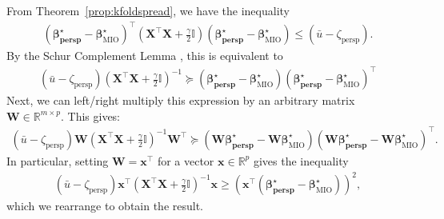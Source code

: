 \documentclass[ijoc,noblindrev]{informs3} %
\newcommand{\ag}[1]{{\color{black}#1}}
\begin{document}
From Theorem~\ref{prop:kfoldspread}, we have the inequality
\begin{align}
(\bm{\beta^\star_{\text{persp}}}- \bm{\beta}^\star_{\text{MIO}})^\top \left(\bm{X}^\top \bm{X}+\frac{\gamma}{2} \bm{\mathbb{I}}\right) (\bm{\beta^\star_{\text{persp}}}- \bm{\beta}^\star_{\text{MIO}}) \leq (\bar{u}-\zeta_{\text{persp}}).
	\end{align}
 By the Schur Complement Lemma \citep[see, e.g.,][]{boyd1994linear}, this is equivalent to
 \begin{align*}
     (\bar{u}-\zeta_{\text{persp}}) \left(\bm{X}^\top \bm{X}+\frac{\gamma}{2} \bm{\mathbb{I}}\right)^{-1}\succeq (\bm{\beta^\star_{\text{persp}}}- \bm{\beta}^\star_{\text{MIO}})(\bm{\beta^\star_{\text{persp}}}- \bm{\beta}^\star_{\text{MIO}})^\top
 \end{align*}
 Next, we can left/right multiply this expression by an arbitrary matrix $\bm{W} \in \mathbb{R}^{m \times p}$. This gives:
 \begin{align*}
     (\bar{u}-\zeta_{\text{persp}}) \bm{W}\left(\bm{X}^\top \bm{X}+\frac{\gamma}{2} \bm{\mathbb{I}}\right)^{-1}\bm{W}^\top\succeq (\bm{W}\bm{\beta^\star_{\text{persp}}}- \bm{W}\bm{\beta}^\star_{\text{MIO}})(\bm{W}\bm{\beta^\star_{\text{persp}}}- \bm{W}\bm{\beta}^\star_{\text{MIO}})^\top.
 \end{align*}
In particular, setting $\bm{W}=\bm{x}^\top$ for a vector $\bm{x} \in \mathbb{R}^{p}$ gives the inequality
 \begin{align*}
     (\bar{u}-\zeta_{\text{persp}}) \bm{x}^\top \left(\bm{X}^\top \bm{X}+\frac{\gamma}{2} \bm{\mathbb{I}}\right)^{-1} \bm{x}\geq (\bm{x}^\top(\bm{\beta^\star_{\text{persp}}}- \bm{\beta}^\star_{\text{MIO}}))^2,
 \end{align*}
 which we rearrange to obtain the result.
\Halmos
	
\endproof
\end{document}
